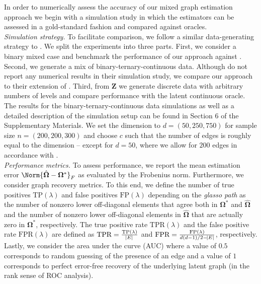 
In order to numerically assess the accuracy of our mixed graph estimation approach we begin with a simulation study in which the estimators can be assessed in a gold-standard fashion and compared against oracles. 
\\

\noindent
{\it Simulation strategy.} 
To facilitate comparison, we follow a similar data-generating strategy to \citet{Fan17}. We split the experiments into three parts. First, we consider a binary mixed case and benchmark the performance of our approach against \citet[][Section 6.1 scenarios c) and d)]{Fan17}. Second, we generate a mix of binary-ternary-continuous data. Although \citet{Quan18} do not report any numerical results in their simulation study, we compare our approach to their extension of \citet{Fan17}. Third, from $\boldsymbol{Z}$ we generate discrete data with arbitrary numbers of levels  and compare performance with the latent continuous oracle. The results for the binary-ternary-continuous data simulations as well as a detailed description of the simulation setup can be found in Section 6 
of the Supplementary Materials. We set the dimension to $d = (50,250,750)$ for sample size $n = (200,200,300)$ and choose $c$ such that the number of edges is roughly equal to the dimension -- except for $d = 50$, where we allow for $200$ edges in accordance with \citet{Fan17}.       
\\

\noindent
{\it Performance metrics.} 
To assess performance, we report the mean estimation error $\Norm{\hat{\boldsymbol{\Omega}} - \boldsymbol\Omega^*}_F$ 
as evaluated by the Frobenius norm.
Furthermore, we consider graph recovery metrics. To this end, we define the number of true positives $\text{TP}(\lambda)$ and false positives $\text{FP}(\lambda)$ depending on the \textit{glasso path} as the number of nonzero lower off-diagonal elements that agree both in $\boldsymbol\Omega^*$ and $\hat{\boldsymbol\Omega}$ and the number of nonzero lower off-diagonal elements in $\hat{\boldsymbol\Omega}$ that are actually zero in $\boldsymbol\Omega^*$, respectively. The true positive rate $\text{TPR}(\lambda)$ and the false positive rate $\text{FPR}(\lambda)$ are defined as $\text{TPR} = \frac{\text{TP}(\lambda)}{\abs{E}} $ and $\text{FPR} = \frac{\text{FP}(\lambda)}{d(d-1)/2 - \abs{E}}$, respectively. Lastly, we consider the area under the curve (AUC) where a value of $0.5$ corresponds to random guessing of the presence of an edge and a value of $1$ corresponds to perfect error-free recovery of the underlying latent graph (in the rank sense of ROC analysis).

